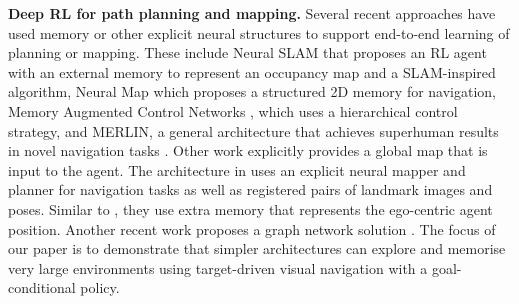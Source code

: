 {\bf Deep RL for path planning and mapping.} 
Several recent approaches have used memory or other explicit neural structures to support end-to-end learning of planning or mapping. These include Neural SLAM \cite{zhang2017neural} that proposes an RL agent with an external memory to represent an occupancy map and a SLAM-inspired algorithm, Neural Map \cite{parisotto2017neural} which proposes a structured 2D memory for navigation, Memory Augmented Control Networks \cite{khan2017memory}, which uses a hierarchical control strategy, and MERLIN, a general architecture that achieves superhuman results in novel navigation tasks \cite{wayne2018unsupervised}. Other work \cite{brunner2017teaching,chaplot2018active} explicitly provides a global map that is input to the agent. 
The architecture in \cite{gupta2017unifying} uses an explicit neural mapper and planner for navigation tasks as well as registered pairs of landmark images and poses. Similar to \cite{gupta2017cognitive,zhang2017neural}, they use extra memory that represents the ego-centric agent position. Another recent work proposes a graph network solution \cite{savinov2018semi}. The focus of our paper is to demonstrate that simpler architectures can explore and memorise very large environments using target-driven visual navigation with a goal-conditional policy.


